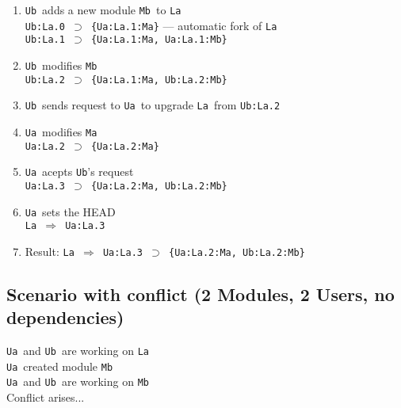 \documentclass[10pt]{article}
\def\Ua{{\tt Ua}}
\def\Ub{{\tt Ub}}
\def\La{{\tt La}}
\def\Ma{{\tt Ma}}
\def\Mb{{\tt Mb}}
\def\headsto{${\Longrightarrow}$ }
\def\hto{\headsto}
\def\eq{${\supset}$ }
\begin{document}
		\begin{enumerate}
			\item{\Ub\ adds a new module \Mb\ to \La\\
				{\tt Ub:La.0 \eq \{Ua:La.1:Ma\}} --- automatic fork of \La\\
				{\tt Ub:La.1 \eq \{Ua:La.1:Ma, Ua:La.1:Mb\}}
			}
			\item{\Ub\ modifies \Mb\\
				{\tt Ub:La.2 \eq \{Ua:La.1:Ma, Ub:La.2:Mb\}}
			}
			\item{\Ub\ sends request to \Ua\ to upgrade \La\ from {\tt Ub:La.2}}
			\item{\Ua\ modifies \Ma\\
				{\tt Ua:La.2 \eq \{Ua:La.2:Ma\}}
			}
			\item{\Ua\ acepts \Ub's request\\
				{\tt Ua:La.3 \eq \{Ua:La.2:Ma, Ub:La.2:Mb\}}
			}
			\item{\Ua\ sets the HEAD\\
				{\tt La \hto Ua:La.3}
			}
			\item{Result: {\tt La \hto Ua:La.3 \eq \{Ua:La.2:Ma, Ub:La.2:Mb\}}}
		\end{enumerate}

	\subsection{Scenario with conflict (2 Modules, 2 Users, no dependencies)}

		\Ua\ and \Ub\ are working on \La\\ 
		\Ua\ created module \Mb\\
		\Ua\ and \Ub\ are working on \Mb\\
		Conflict arises...
\end{document}
